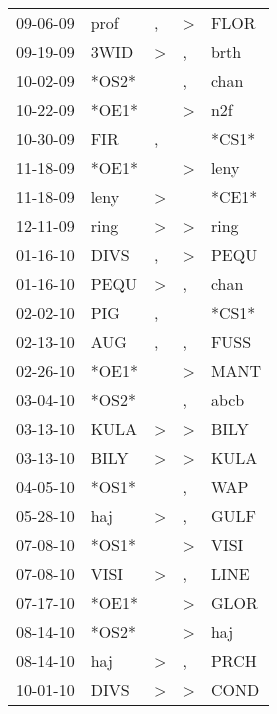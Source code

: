 \begin{supertabular}{lllll}
 09-06-09 &   prof &                , &     \textgreater &   FLOR \\
 09-19-09 &   3WID &     \textgreater &                , &   brth \\
 10-02-09 &  *OS2* &                  &                , &   chan \\
 10-22-09 &  *OE1* &                  &     \textgreater &    n2f \\
 10-30-09 &    FIR &                , &                  &  *CS1* \\
 11-18-09 &  *OE1* &                  &     \textgreater &   leny \\
 11-18-09 &   leny &     \textgreater &                  &  *CE1* \\
 12-11-09 &   ring &     \textgreater &     \textgreater &   ring \\
 01-16-10 &   DIVS &                , &     \textgreater &   PEQU \\
 01-16-10 &   PEQU &     \textgreater &                , &   chan \\
 02-02-10 &    PIG &                , &                  &  *CS1* \\
 02-13-10 &    AUG &                , &                , &   FUSS \\
 02-26-10 &  *OE1* &                  &     \textgreater &   MANT \\
 03-04-10 &  *OS2* &                  &                , &   abcb \\
 03-13-10 &   KULA &     \textgreater &     \textgreater &   BILY \\
 03-13-10 &   BILY &     \textgreater &     \textgreater &   KULA \\
 04-05-10 &  *OS1* &                  &                , &    WAP \\
 05-28-10 &    haj &     \textgreater &                , &   GULF \\
 07-08-10 &  *OS1* &                  &     \textgreater &   VISI \\
 07-08-10 &   VISI &     \textgreater &                , &   LINE \\
 07-17-10 &  *OE1* &                  &     \textgreater &   GLOR \\
 08-14-10 &  *OS2* &                  &     \textgreater &    haj \\
 08-14-10 &    haj &     \textgreater &                , &   PRCH \\
 10-01-10 &   DIVS &     \textgreater &     \textgreater &   COND \\

\end{supertabular}
